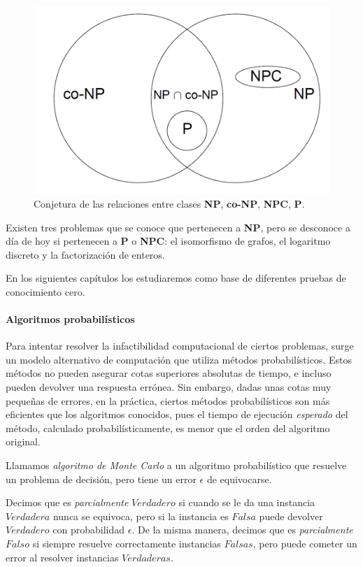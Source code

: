 \begin{figure}[bth]
	\begin{center}
		\includegraphics[width=.45\linewidth]{gfx/NPclasses}
	\end{center}
	\caption{Conjetura de las relaciones entre clases \textbf{NP}, \textbf{co-NP}, \textbf{NPC}, \textbf{P}.}
	\label{fig:NPclasses}
\end{figure}


Existen tres problemas que se conoce que pertenecen a \textbf{NP}, pero se desconoce a día de hoy si pertenecen a \textbf{P} o \textbf{NPC}: el isomorfismo de grafos, el logaritmo discreto y la factorización de enteros.

En los siguientes capítulos los estudiaremos como base de diferentes pruebas de conocimiento cero.


\hfil


\paragraph{Algoritmos probabilísticos} 

\hfil

Para intentar resolver la infactibilidad computacional de ciertos problemas, surge un modelo alternativo de computación que utiliza métodos probabilísticos. Estos métodos no pueden asegurar cotas superiores absolutas de tiempo, e incluso pueden devolver una respuesta errónea. Sin embargo, dadas unas cotas muy pequeñas de errores, en la práctica, ciertos métodos probabilísticos son más eficientes que los algoritmos conocidos, pues el tiempo de ejecución \textit{esperado} del método, calculado probabilísticamente, es menor que el orden del algoritmo original.



\begin{definition}
	Llamamos \textit{algoritmo de Monte Carlo} a un algoritmo probabilístico que resuelve un problema de decisión, pero tiene un error $\epsilon$ de equivocarse.
	
	Decimos que es \textit{parcialmente} $Verdadero$ si cuando se le da una instancia $Verdadera$ nunca se equivoca, pero si la instancia es $Falsa$ puede devolver $Verdadero$ con probabilidad $\epsilon$. De la misma manera, decimos que es \textit{parcialmente} $Falso$ si siempre resuelve correctamente instancias $Falsas$, pero puede cometer un error al resolver instancias $Verdaderas$.
\end{definition}


